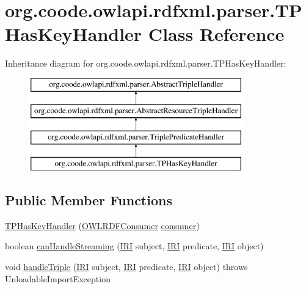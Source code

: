 \hypertarget{classorg_1_1coode_1_1owlapi_1_1rdfxml_1_1parser_1_1_t_p_has_key_handler}{\section{org.\-coode.\-owlapi.\-rdfxml.\-parser.\-T\-P\-Has\-Key\-Handler Class Reference}
\label{classorg_1_1coode_1_1owlapi_1_1rdfxml_1_1parser_1_1_t_p_has_key_handler}
}
Inheritance diagram for org.\-coode.\-owlapi.\-rdfxml.\-parser.\-T\-P\-Has\-Key\-Handler\-:\begin{figure}[H]
\begin{center}
\leavevmode
\includegraphics[height=4.000000cm]{classorg_1_1coode_1_1owlapi_1_1rdfxml_1_1parser_1_1_t_p_has_key_handler}
\end{center}
\end{figure}
\subsection*{Public Member Functions}
\begin{DoxyCompactItemize}
\item 
\hyperlink{classorg_1_1coode_1_1owlapi_1_1rdfxml_1_1parser_1_1_t_p_has_key_handler_ac990fbbc989771937884b756929cf907}{T\-P\-Has\-Key\-Handler} (\hyperlink{classorg_1_1coode_1_1owlapi_1_1rdfxml_1_1parser_1_1_o_w_l_r_d_f_consumer}{O\-W\-L\-R\-D\-F\-Consumer} \hyperlink{classorg_1_1coode_1_1owlapi_1_1rdfxml_1_1parser_1_1_abstract_triple_handler_a4ccf4d898ff01eb1cadfa04b23d54e9c}{consumer})
\item 
boolean \hyperlink{classorg_1_1coode_1_1owlapi_1_1rdfxml_1_1parser_1_1_t_p_has_key_handler_af873a64bfbf59194b8508c8a6076b517}{can\-Handle\-Streaming} (\hyperlink{classorg_1_1semanticweb_1_1owlapi_1_1model_1_1_i_r_i}{I\-R\-I} subject, \hyperlink{classorg_1_1semanticweb_1_1owlapi_1_1model_1_1_i_r_i}{I\-R\-I} predicate, \hyperlink{classorg_1_1semanticweb_1_1owlapi_1_1model_1_1_i_r_i}{I\-R\-I} object)
\item 
void \hyperlink{classorg_1_1coode_1_1owlapi_1_1rdfxml_1_1parser_1_1_t_p_has_key_handler_af0447203c65bfac95f65adc6a8e91b1e}{handle\-Triple} (\hyperlink{classorg_1_1semanticweb_1_1owlapi_1_1model_1_1_i_r_i}{I\-R\-I} subject, \hyperlink{classorg_1_1semanticweb_1_1owlapi_1_1model_1_1_i_r_i}{I\-R\-I} predicate, \hyperlink{classorg_1_1semanticweb_1_1owlapi_1_1model_1_1_i_r_i}{I\-R\-I} object)  throws Unloadable\-Import\-Exception 
\end{DoxyCompactItemize}
